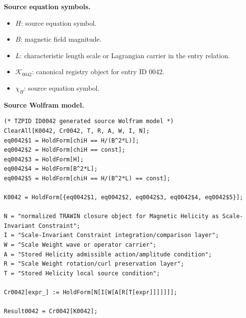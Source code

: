 \begin{minipage}[t]{0.49\linewidth}
\begingroup
\small
\raggedright
\textbf{Source equation symbols.}\par
\begin{itemize}[leftmargin=1.35em,itemsep=1pt,topsep=1pt,parsep=0pt]
    \item $H$: source equation symbol.
    \item $B$: magnetic field magnitude.
    \item $L$: characteristic length scale or Lagrangian carrier in the entry relation.
    \item $\mathcal{K}_{0042}$: canonical registry object for entry ID 0042.
    \item $\chi_{H}$: source equation symbol.
\end{itemize}
\endgroup
\end{minipage}\hfill
\begin{minipage}[t]{0.47\linewidth}
\begingroup
\scriptsize
\raggedright
\textbf{Source Wolfram model.}\par
\begin{Verbatim}[fontsize=\tiny,breaklines=true,breakanywhere=true]
(* TZPID ID0042 generated source Wolfram model *)
ClearAll[K0042, Cr0042, T, R, A, W, I, N];
eq0042$1 = HoldForm[chiH == H/(B^2*L)];
eq0042$2 = HoldForm[chiH == const];
eq0042$3 = HoldForm[H];
eq0042$4 = HoldForm[B^2*L];
eq0042$5 = HoldForm[chiH == H/(B^2*L) == const];

K0042 = HoldForm[{eq0042$1, eq0042$2, eq0042$3, eq0042$4, eq0042$5}];

N = "normalized TRAWIN closure object for Magnetic Helicity as Scale-Invariant Constraint";
I = "Scale-Invariant Constraint integration/comparison layer";
W = "Scale Weight wave or operator carrier";
A = "Stored Helicity admissible action/amplitude condition";
R = "Scale Weight rotation/curl preservation layer";
T = "Stored Helicity local source condition";

Cr0042[expr_] := HoldForm[N[I[W[A[R[T[expr]]]]]]];

Result0042 = Cr0042[K0042];
\end{Verbatim}
\endgroup
\end{minipage}

